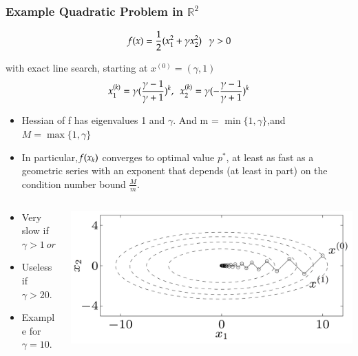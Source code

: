 \begin{frame}
  \frametitle{Example Quadratic Problem in $\mathbb{R}^2$}

{
\tiny

\begin{equation}
f(x) = \frac{1}{2}(x_1^2 + \gamma x_{2}^2) ~~~ \gamma > 0
\end{equation}


with exact line search, starting at $x^{(0)} = (\gamma, 1)$
$$x_{1}^{(k)} = \gamma (\frac{\gamma - 1}{\gamma + 1})^k, ~~
x_{2}^{(k)} = \gamma (-\frac{\gamma - 1}{\gamma + 1})^k$$
}
\vspace{-8mm}

{
\tiny
\begin{itemize}
\item Hessian of f has eigenvalues 1 and $\gamma$. And m = $\min\{1,
    \gamma\}$,and $M = \max\{1, \gamma\}$
\item In particular,$f(x_{k})$ converges to optimal value $p^*$,  at
  least as fast as a geometric series with an exponent that depends
  (at least in part) on the condition number bound $\frac{M}{m}$.

\end{itemize}


}
\begin{columns}

  \begin{column}{0.6\textwidth}


\begin{itemize}
\item Very slow if $\gamma > 1~ or ~ \gamma < 1$
\item Useless if $\gamma > 20$.
\item Example for $\gamma = 10$.
\end{itemize}
\end{column}

\begin{column}{0.5\textwidth}
\includegraphics[scale=0.12, center]{pics/example.png}
\end{column}


\end{columns}
\end{frame}


